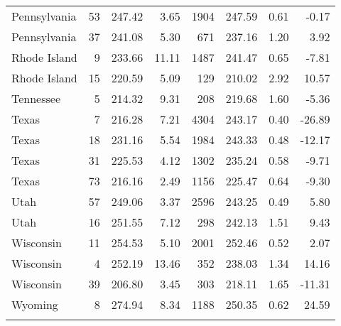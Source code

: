\begin{longtable}{lrrr@{\extracolsep{10pt}}rrrr}
  Pennsylvania &  53 & 247.42 & 3.65 & 1904 & 247.59 & 0.61 & -0.17 \\ 
  Pennsylvania &  37 & 241.08 & 5.30 & 671 & 237.16 & 1.20 & 3.92 \\ 
  Rhode Island &   9 & 233.66 & 11.11 & 1487 & 241.47 & 0.65 & -7.81 \\ 
  Rhode Island &  15 & 220.59 & 5.09 & 129 & 210.02 & 2.92 & 10.57 \\ 
  Tennessee &   5 & 214.32 & 9.31 & 208 & 219.68 & 1.60 & -5.36 \\ 
  Texas &   7 & 216.28 & 7.21 & 4304 & 243.17 & 0.40 & -26.89 \\ 
  Texas &  18 & 231.16 & 5.54 & 1984 & 243.33 & 0.48 & -12.17 \\ 
  Texas &  31 & 225.53 & 4.12 & 1302 & 235.24 & 0.58 & -9.71 \\ 
  Texas &  73 & 216.16 & 2.49 & 1156 & 225.47 & 0.64 & -9.30 \\ 
  Utah &  57 & 249.06 & 3.37 & 2596 & 243.25 & 0.49 & 5.80 \\ 
  Utah &  16 & 251.55 & 7.12 & 298 & 242.13 & 1.51 & 9.43 \\ 
  Wisconsin &  11 & 254.53 & 5.10 & 2001 & 252.46 & 0.52 & 2.07 \\ 
  Wisconsin &   4 & 252.19 & 13.46 & 352 & 238.03 & 1.34 & 14.16 \\ 
  Wisconsin &  39 & 206.80 & 3.45 & 303 & 218.11 & 1.65 & -11.31 \\ 
  Wyoming &   8 & 274.94 & 8.34 & 1188 & 250.35 & 0.62 & 24.59 \\ 
   \hline
\hline
\label{g4mathlraiclevel1}
\end{longtable}
